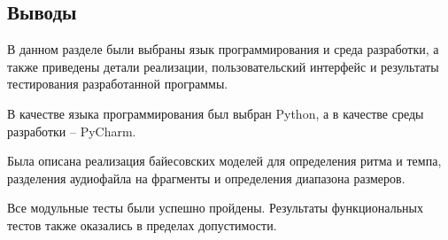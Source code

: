 \subsection*{Выводы}

В данном разделе были выбраны язык программирования и среда разработки, а также приведены детали реализации, пользовательский интерфейс и результаты тестирования разработанной программы.

В качестве языка программирования был выбран Python, а в качестве среды разработки -- PyCharm.

Была описана реализация байесовских моделей для определения ритма и темпа, разделения аудиофайла на фрагменты и определения диапазона размеров.

Все модульные тесты были успешно пройдены. Результаты функциональных тестов также оказались в пределах допустимости.

